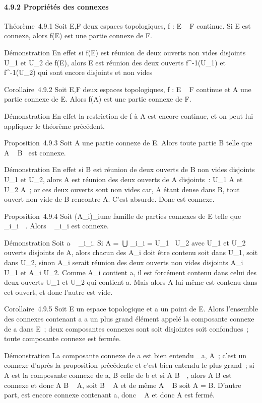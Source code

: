 \documentclass[]{article}
\begin{document}
\paragraph{4.9.2 Propriétés des connexes}

Théorème~4.9.1 Soit E,F deux espaces topologiques, f : E \rightarrow~ F continue.
Si E est connexe, alors f(E) est une partie connexe de F.

Démonstration En effet si f(E) est réunion de deux ouverts non vides
disjoints U_1 et U_2 de f(E), alors E est réunion des
deux ouverts f^-1(U_1) et
f^-1(U_2) qui sont encore disjoints et non vides

Corollaire~4.9.2 Soit E,F deux espaces topologiques, f : E \rightarrow~ F continue
et A une partie connexe de E. Alors f(A) est une partie connexe de F.

Démonstration En effet la restriction de f à A est encore continue, et
on peut lui appliquer le théorème précédent.

Proposition~4.9.3 Soit A une partie connexe de E. Alors toute partie B
telle que A \subset~ B \subset~\overlineA est connexe.

Démonstration En effet si B est réunion de deux ouverts de B non vides
disjoints U_1 et U_2, alors A est réunion des deux
ouverts de A disjoints~: U_1 \bigcap A et U_2 \bigcap A~; or ces
deux ouverts sont non vides car, A étant dense dans B, tout ouvert non
vide de B rencontre A. C'est absurde. Donc \overlineA
est connexe.

Proposition~4.9.4 Soit (A_i)_i\inI une famille de
parties connexes de E telle que
\⋂ ~
_i\inIA_i\neq~\varnothing~. Alors
\⋃ ~
_i\inIA_i est connexe.

Démonstration Soit a
\in\⋂ ~
_i\inIA_i. Si A =\
⋃  _i\inIA_i = U_1~ \cup
U_2 avec U_1 et U_2 ouverts disjoints de A,
alors chacun des A_i doit être contenu soit dans U_1,
soit dans U_2, sinon A_i serait réunion des deux
ouverts non vides disjoints A_i \bigcap U_1 et A_i
\bigcap U_2. Comme A_i contient a, il est forcément contenu
dans celui des deux ouverts U_1 et U_2 qui contient a.
Mais alors A lui-même est contenu dans cet ouvert, et donc l'autre est
vide.

Corollaire~4.9.5 Soit E un espace topologique et a un point de E. Alors
l'ensemble des connexes contenant a a un plus grand élément appelé la
composante connexe de a dans E~; deux composantes connexes sont soit
disjointes soit confondues~; toute composante connexe est fermée.

Démonstration La composante connexe de a est bien entendu
\⋃  _a\inA,
A\textconnexeA~; c'est un connexe d'après la
proposition précédente et c'est bien entendu le plus grand~; si A est la
composante connexe de a, B celle de b et si A \bigcap
B\neq~\varnothing~, alors A \cup B est connexe et donc A \cup B \subset~
A, soit B \subset~ A et de même A \subset~ B soit A = B. D'autre part,
\overlineA est encore connexe contenant a, donc
\overlineA \subset~ A et donc A est fermé.
\end{document}
